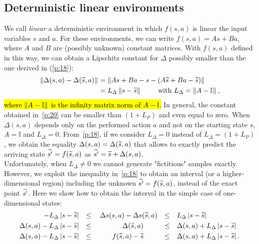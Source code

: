 \subsection{Deterministic linear environments}\label{app:b1}
\noindent We call \textit{linear} a deterministic environment in which $f(s, a)$ is linear \wrt the input variables $s$ and $a$. For these environments, we can write $f(s,a) = As + Ba$, where $A$ and $B$ are (possibly unknown) constant matrices. With $f(s,a)$ defined in this way, we can obtain a Lipschitz constant for $\Delta$ possibly smaller than the one derived in (\ref{p:18}):
\begin{align}
\left\|\Delta(s,a)-\Delta(\widetilde{s},a)\right\|_{} &= \left\|As+Ba-s - \left(A\widetilde{s}+Ba-\widetilde{s}\right)\right\|_{} \nonumber \\
&= L_{\Delta} \left\|s-\widetilde{s}\right\|_{} \qquad \text{ with } L_{\Delta}=\left\|A-\mathbb{I}\right\|_{}, \label{p:20}
\end{align}
\hl{where $\left\|A-\mathbb{I}\right\|_{}$ is the infinity matrix norm of $A-\mathbb{I}$.}
In general, the constant obtained in~\eqref{p:20} can be smaller than $\left(1 + L_{P}\right)$ and even equal to zero. When $\Delta(s,a)$ depends only on the performed action $a$ and not on the starting state $s$,  $A=\mathbb{I}$ and $L_{\Delta}=0$. From~\eqref{p:18}, if we consider $L_{\Delta} = 0$ instead of $L_{\Delta} = \left(1 + L_{P}\right)$, we obtain the equality $\Delta(s,a) = \Delta(\widetilde{s}, a)$ that allows to exactly predict the arriving state $\widetilde{s'}=f(\widetilde{s}, a)$ as $\widetilde{s'} = \widetilde{s} + \Delta(s,a)$.\\
\newline
Unfortunately, when $L_{\Delta} \neq 0$ we cannot generate "fictitious" samples exactly. However, we exploit the inequality in~\eqref{p:18} to obtain an interval (or a higher-dimensional region) including the unknown $\widetilde{s'}=f(\widetilde{s},a)$, instead of the exact point $\widetilde{s'}$. Here we show how to obtain the interval in the simple case of one-dimensional states:
\begin{align}
-L_{\Delta} \left|s - \wt{s}\right| &&\leq&& \Delta s (s,a) - \Delta s (\wt{s},a) &&\leq&& &L_{\Delta} \left|s - \wt{s}\right| \nonumber\\
%
\Delta(s,a) - L_{\Delta} \left|s - \wt{s}\right| &&\leq&& \qquad \Delta(\wt{s},a) \qquad &&\leq&& &\Delta(s,a) + L_{\Delta} \left|s - \wt{s}\right| \nonumber\\
%
\Delta(s,a) - L_{\Delta} \left|s - \wt{s}\right| &&\leq&& \qquad f(\wt{s},a) - \wt{s} \qquad &&\leq&& &\Delta(s,a) + L_{\Delta} \left|s - \wt{s}\right|. \label{p:19}
\end{align}
